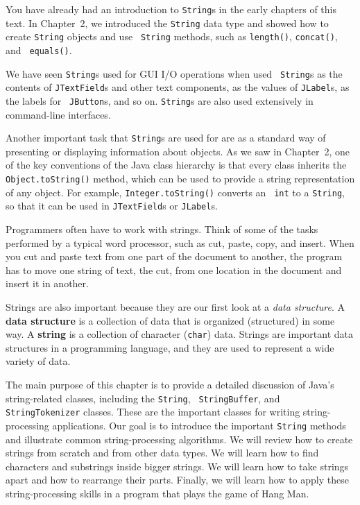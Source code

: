 You have already had an introduction to {\tt String}s in the early
chapters of this text.  In Chapter~2, we introduced the {\tt String}
data type and showed how to create {\tt String} objects and use {\tt
String} methods, such as {\tt length()}, {\tt concat()}, and {\tt
equals()}.

We have seen {\tt String}s used for GUI I/O operations when used {\tt
String}s as the contents of {\tt JTextField}s and other text
components, as the values of {\tt JLabel}s, as the labels for {\tt
JButton}s, and so on. {\tt String}s are also used extensively in
command-line interfaces.

Another important task that {\tt String}s are used for are as a
standard way of presenting or displaying information about objects.
As we saw in Chapter~2, one of the key conventions of the Java class
hierarchy is that every class inherits the {\tt Object.toString()}
method, which can be used to provide a string representation of any
object.  For example, \mbox{\tt Integer.toString()} converts an {\tt
int} to a {\tt String}, so that it can be used in {\tt JTextField}s or
{\tt JLabel}s.

Programmers often have to work with strings.   Think of some of the
tasks performed by a typical word processor, such as cut, paste, copy,
and insert.  When you cut and paste text from one part of the document
to another, the program has to move one string of text, the cut, from
one location in the document and insert it in another.

Strings are also important because they are our first look at a {\em
data structure}.  A {\bf data structure} is a
collection of data that is organized (structured) in some way.  A {\bf
string} is a collection of character ({\tt char}) data.  Strings are
important data structures in a programming language, and they are used
to represent a wide variety of data.

The main purpose of this chapter is to provide a detailed discussion
of Java's string-related classes, including the {\tt String}, {\tt
StringBuffer}, and {\tt StringTokenizer} classes.  These are the
important classes for writing string-processing applications.  Our
goal is to introduce the
important {\tt String} methods and illustrate common string-processing
algorithms.  We will review how to create strings from scratch and from
other data types. We will learn how to find characters and substrings
inside bigger strings.  We will learn how to take strings apart and
how to rearrange their parts.   Finally, we will learn how to apply these
string-processing skills in a program that plays the game of Hang Man.

